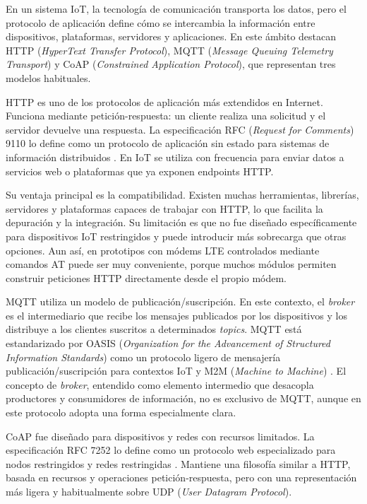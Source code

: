 En un sistema IoT, la tecnología de comunicación transporta los datos, pero el protocolo de aplicación define cómo se intercambia la información entre dispositivos, plataformas, servidores y aplicaciones. En este ámbito destacan HTTP (\textit{HyperText Transfer Protocol}), MQTT (\textit{Message Queuing Telemetry Transport}) y CoAP (\textit{Constrained Application Protocol}), que representan tres modelos habituales.

HTTP es uno de los protocolos de aplicación más extendidos en Internet. Funciona mediante petición-respuesta: un cliente realiza una solicitud y el servidor devuelve una respuesta. La especificación RFC (\textit{Request for Comments}) 9110 lo define como un protocolo de aplicación sin estado para sistemas de información distribuidos \cite{fielding2022http}. En IoT se utiliza con frecuencia para enviar datos a servicios web o plataformas que ya exponen endpoints HTTP.

Su ventaja principal es la compatibilidad. Existen muchas herramientas, librerías, servidores y plataformas capaces de trabajar con HTTP, lo que facilita la depuración y la integración. Su limitación es que no fue diseñado específicamente para dispositivos IoT restringidos y puede introducir más sobrecarga que otras opciones. Aun así, en prototipos con módems LTE controlados mediante comandos AT puede ser muy conveniente, porque muchos módulos permiten construir peticiones HTTP directamente desde el propio módem.

MQTT utiliza un modelo de publicación/suscripción. En este contexto, el \textit{broker} es el intermediario que recibe los mensajes publicados por los dispositivos y los distribuye a los clientes suscritos a determinados \textit{topics}. MQTT está estandarizado por OASIS (\textit{Organization for the Advancement of Structured Information Standards}) como un protocolo ligero de mensajería publicación/suscripción para contextos IoT y M2M (\textit{Machine to Machine}) \cite{oasis_mqtt50}. El concepto de \textit{broker}, entendido como elemento intermedio que desacopla productores y consumidores de información, no es exclusivo de MQTT, aunque en este protocolo adopta una forma especialmente clara.

CoAP fue diseñado para dispositivos y redes con recursos limitados. La especificación RFC 7252 lo define como un protocolo web especializado para nodos restringidos y redes restringidas \cite{shelby2014coap}. Mantiene una filosofía similar a HTTP, basada en recursos y operaciones petición-respuesta, pero con una representación más ligera y habitualmente sobre UDP (\textit{User Datagram Protocol}).

